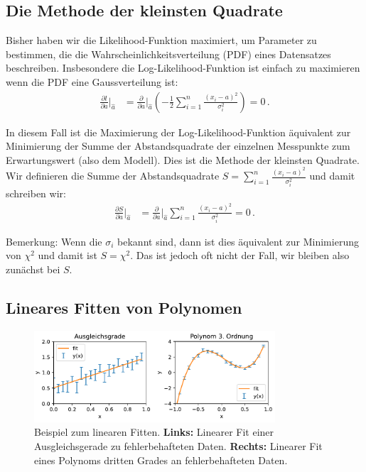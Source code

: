 \subsection{Die Methode der kleinsten Quadrate}
\label{subsec:vl8-4}

Bisher haben wir die Likelihood-Funktion maximiert, um Parameter zu bestimmen, die die Wahrscheinlichkeitsverteilung (PDF) eines Datensatzes beschreiben. Insbesondere die Log-Likelihood-Funktion ist einfach zu maximieren wenn die PDF eine Gaussverteilung ist:
\begin{align}
\frac{ \partial l }{ \partial a } \bigg|_{\hat{a}} &= \frac{ \partial }{ \partial a } \bigg|_{\hat{a}} \left( - \frac{1}{2} \sum_{i=1}^n \frac{ (x_i - a)^2 }{ \sigma_i^2 } \right) = 0\,.
\label{eq:vl8-17}
\end{align}

In diesem Fall ist die Maximierung der Log-Likelihood-Funktion \"aquivalent zur Minimierung der Summe der  Abstandsquadrate der einzelnen Messpunkte zum Erwartungswert (also dem Modell). Dies ist die Methode der kleinsten Quadrate.
Wir definieren die Summe der Abstandsquadrate $S = \sum_{i=1}^n \frac{ (x_i - a)^2 }{ \sigma_i^2 }$ und damit schreiben wir:
\begin{align}
\frac{ \partial S }{ \partial a } \bigg|_{\hat{a}} &= \frac{ \partial }{ \partial a } \bigg|_{\hat{a}} \sum_{i=1}^n \frac{ (x_i - a)^2 }{ \sigma_i^2 } = 0\,.
\label{eq:vl8-18}
\end{align}

Bemerkung: Wenn die $\sigma_i$ bekannt sind, dann ist dies \"aquivalent zur Minimierung von $\chi^2$ und damit ist $S = \chi^2$. Das ist jedoch oft nicht der Fall, wir bleiben also zun\"achst bei $S$.


\subsection{Lineares Fitten von Polynomen}
\label{subsec:vl8-5}

\begin{figure}[tbp]
    \centering
        \includegraphics[width=0.8\textwidth]{Figures/linear_fitting_image.pdf}
        \caption{Beispiel zum linearen Fitten. \textbf{Links:} Linearer Fit einer Ausgleichsgerade zu fehlerbehafteten Daten. \textbf{Rechts:} Linearer Fit eines Polynoms dritten Grades an fehlerbehafteten Daten. }
        \label{fig:linearFit}
\end{figure} 

